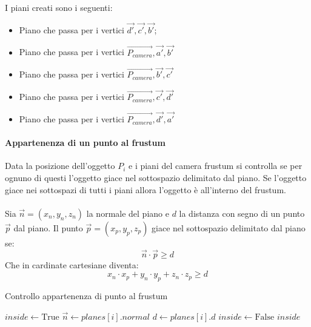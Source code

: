 I piani creati sono i seguenti:
\begin{itemize}
	\item Piano che passa per i vertici $\vec{d'}, \vec{c'}, \vec{b'}$;
	\item Piano che passa per i vertici $\overrightarrow{P_{camera}}, \vec{a'}, \vec{b'}$
	\item Piano che passa per i vertici $\overrightarrow{P_{camera}}, \vec{b'}, \vec{c'}$
	\item Piano che passa per i vertici $\overrightarrow{P_{camera}}, \vec{c'}, \vec{d'}$
	\item Piano che passa per i vertici $\overrightarrow{P_{camera}}, \vec{d'}, \vec{a'}$
\end{itemize}

\paragraph{Appartenenza di un punto al frustum}
Data la posizione dell'oggetto $P_i$ e i piani del camera frustum si controlla se per ognuno di questi l'oggetto giace nel sottospazio delimitato dal piano. Se l'oggetto giace nei sottospazi di tutti i piani allora l'oggetto è all'interno del frustum.\\\\
Sia $\vec{n}=(x_n,y_n,z_n)$ la normale del piano e $d$ la distanza con segno di un punto $\vec{p}$ dal piano. Il punto $\vec{p}=(x_p,y_p,z_p)$ giace nel sottospazio delimitato dal piano se:
\begin{equation}
	\vec{n} \cdot \vec{p} \geq d
\end{equation}
Che in cardinate cartesiane diventa:
\begin{equation}
	x_n \cdot x_p + y_n \cdot y_p + z_n \cdot z_p \geq d
\end{equation}

\begin{algorithm}
	\caption{Controllo appartenenza di punto al frustum}
	\begin{algorithmic}[1]
		\State $inside \gets \text{True}$
		\State $\vec{n} \gets planes[i].normal$
		\State $d \gets planes[i].d$
		\State $inside \gets \text{False}$
		\EndIf
		\EndFor
		\State \Return $inside$
		\EndProcedure
	\end{algorithmic}
\end{algorithm}

